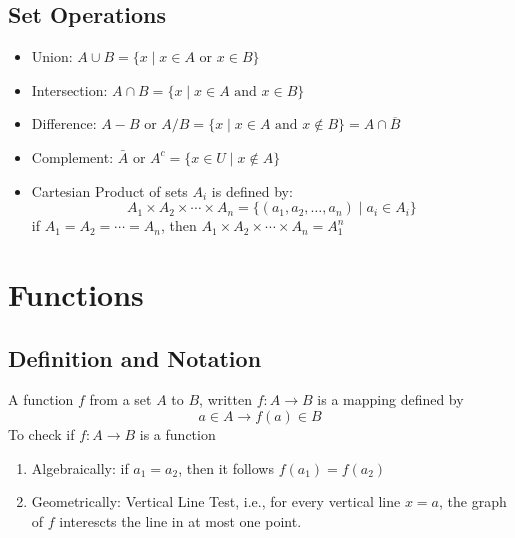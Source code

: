 \documentclass[11pt]{article}
\begin{document}
\subsection{Set Operations}
\begin{itemize}
    \item Union: $A\cup B = \{x \mid x \in A \text{ or } x \in B\}$ 
    \item Intersection: $A\cap B = \{x \mid x \in A \text{ and } x \in B\}$ 
    \item Difference: $A - B \text{ or }A/B = \{x \mid x \in A \text{ and } x \notin B\} = A \cap \overline{B}$
    \item Complement: $\bar{A} \text{ or } A^c = \{x \in U \mid x \notin A\}$
    \item Cartesian Product of sets $A_i$ is defined by:
        \[
            A_1\times A_2 \times \cdots \times A_n  = \{ (a_1, a_2, \dots, a_n) \mid a_i \in A_i \}
        \]
        if $A_1 = A_2 = \cdots = A_n$, then $A_1\times A_2 \times \cdots \times A_n = A_{1}^n$
    \end{itemize}
\section{Functions}
\subsection{Definition and Notation}
A function $f$ from a set $A$ to $B$, written $f: A\to B$ is a mapping defined by
\[
    a \in A \to f(a) \in B
\]
To check if $f: A\to B$ is a function
\begin{enumerate}
    \item Algebraically: if $a_1 = a_2$, then it follows $f(a_1) = f(a_2)$
    \item Geometrically: Vertical Line Test, i.e., for every vertical line $x = a$, the graph of $f$ interescts the line in at most one point.
\end{enumerate}
\end{document}
